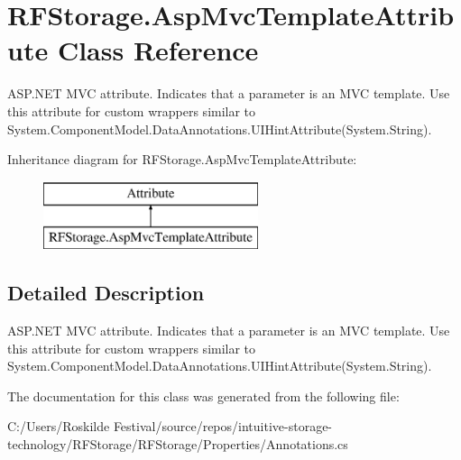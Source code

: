 \section{R\+F\+Storage.\+Asp\+Mvc\+Template\+Attribute Class Reference}
\label{class_r_f_storage_1_1_asp_mvc_template_attribute}


A\+S\+P.\+N\+ET M\+VC attribute. Indicates that a parameter is an M\+VC template. Use this attribute for custom wrappers similar to {\ttfamily System.\+Component\+Model.\+Data\+Annotations.\+U\+I\+Hint\+Attribute(System.\+String)}.  


Inheritance diagram for R\+F\+Storage.\+Asp\+Mvc\+Template\+Attribute\+:\begin{figure}[H]
\begin{center}
\leavevmode
\includegraphics[height=2.000000cm]{class_r_f_storage_1_1_asp_mvc_template_attribute}
\end{center}
\end{figure}


\subsection{Detailed Description}
A\+S\+P.\+N\+ET M\+VC attribute. Indicates that a parameter is an M\+VC template. Use this attribute for custom wrappers similar to {\ttfamily System.\+Component\+Model.\+Data\+Annotations.\+U\+I\+Hint\+Attribute(System.\+String)}. 



The documentation for this class was generated from the following file\+:\begin{DoxyCompactItemize}
\item 
C\+:/\+Users/\+Roskilde Festival/source/repos/intuitive-\/storage-\/technology/\+R\+F\+Storage/\+R\+F\+Storage/\+Properties/Annotations.\+cs\end{DoxyCompactItemize}
